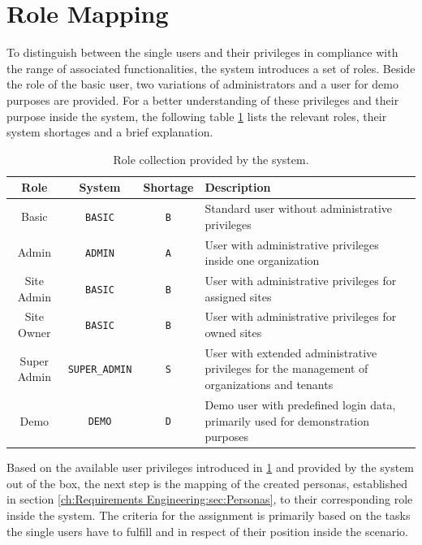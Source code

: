 \section{Role Mapping}
\label{ch:Requirements Engineering:sec:Role Mapping}

To distinguish between the single users and their privileges in compliance with the range of associated functionalities, the system introduces a set of roles. Beside the role of the basic user, two variations of administrators and a user for demo purposes are provided.
For a better understanding of these privileges and their purpose inside the system, the following table \ref{tab:system-role-collection} lists the relevant roles, their system shortages and a brief explanation.

\begingroup
\setlength{\tabcolsep}{10pt} %
\renewcommand{\arraystretch}{1.5} %
\begin{table}[h]
    \centering
    \caption{Role collection provided by the system.}
    \begin{tabular}{c|c|c|m{6cm}}
        Role & System & Shortage & Description \\
        \hline
        Basic & \verb|BASIC| & \verb|B| & Standard user without administrative privileges \\
        Admin & \verb|ADMIN| & \verb|A| & User with administrative privileges inside one organization \\
        Site Admin & \verb|BASIC| & \verb|B| & User with administrative privileges for assigned sites \\
        Site Owner & \verb|BASIC| & \verb|B| & User with administrative privileges for owned sites \\
        Super Admin & \verb|SUPER_ADMIN| & \verb|S| & User with extended administrative privileges for the management of organizations and tenants \\
        Demo & \verb|DEMO| & \verb|D| & Demo user with predefined login data, primarily used for demonstration purposes \\
    \end{tabular}
    \label{tab:system-role-collection}
\end{table}
\endgroup

Based on the available user privileges introduced in \ref{tab:system-role-collection} and provided by the system out of the box, the next step is the mapping of the created personas, established in section \ref{ch:Requirements Engineering:sec:Personas}, to their corresponding role inside the system.
The criteria for the assignment is primarily based on the tasks the single users have to fulfill and in respect of their position inside the scenario.

